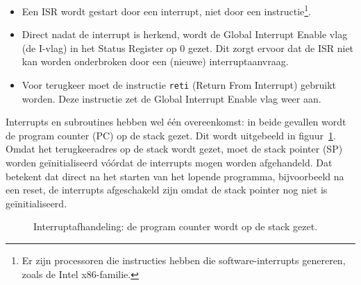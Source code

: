\begin{itemize}
\item Een ISR wordt gestart door een interrupt, niet door een
instructie\footnote{Er zijn processoren die instructies hebben die
software-interrupts genereren, zoals de Intel x86-familie.}.

\item Direct nadat de interrupt is herkend, wordt de Global Interrupt Enable
vlag (de I-vlag) in het Status Register op 0 gezet. Dit zorgt ervoor dat de
ISR niet kan worden onderbroken door een (nieuwe) interruptaanvraag.

\item Voor terugkeer moet de instructie \lstinline|reti| (Return From
Interrupt) gebruikt worden. Deze instructie zet de Global Interrupt Enable
vlag weer aan.
\end{itemize}

Interrupts en subroutines hebben wel \'e\'en overeenkomst: in beide gevallen
wordt de program counter (PC) op de stack gezet. Dit wordt uitgebeeld in
figuur~\ref{fig:intinterruptdispatchwithstackandiflag}. Omdat het
terugkeeradres op de stack wordt gezet, moet de stack pointer (SP) worden
ge\"initialiseerd v\'o\'ordat de interrupts mogen worden afgehandeld. Dat
betekent dat direct na het starten van het lopende programma, bijvoorbeeld
na een reset, de interrupts afgeschakeld zijn omdat de
stack pointer nog niet is ge\"initialiseerd.


\begin{figure}[!ht]
\centering
{}
\caption{Interruptafhandeling: de program counter wordt op de stack gezet.}
\label{fig:intinterruptdispatchwithstackandiflag}
\end{figure}

